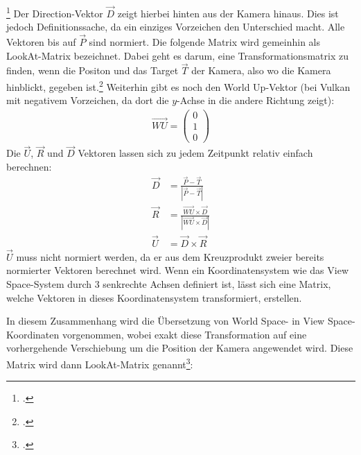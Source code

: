 \documentclass[titlepage, 11pt, a4paper, ngerman]{article}
\begin{document}
\footcitetext{logl-camera}
Der Direction-Vektor $\vec{D}$ zeigt hierbei hinten aus der Kamera hinaus. Dies ist jedoch Definitionssache, da ein einziges Vorzeichen den Unterschied macht. Alle Vektoren bis auf $\vec{P}$ sind normiert. Die folgende Matrix wird gemeinhin als LookAt-Matrix bezeichnet. Dabei geht es darum, eine Transformationsmatrix zu finden, wenn die Positon und das Target $\vec{T}$ der Kamera, also wo die Kamera hinblickt, gegeben ist.\footcite{camera} Weiterhin gibt es noch den World Up-Vektor (bei Vulkan mit negativem Vorzeichen, da dort die $y$-Achse in die andere Richtung zeigt): 
\begin{align*}
    \vec{WU} = \begin{pmatrix}
    0 \\
    1 \\
    0
    \end{pmatrix}
\end{align*}
\bigbreak
Die $\vec{U}$, $\vec{R}$ und $\vec{D}$ Vektoren lassen sich zu jedem Zeitpunkt relativ einfach berechnen:
\begin{align*}
    \vec{D} &= \frac{\vec{P} - \vec{T}}{|\vec{P} - \vec{T}|} \\
    \vec{R} &= \frac{\vec{WU} \times \vec{D}}{|\vec{WU} \times \vec{D}|} \\
    \vec{U} &= \vec{D} \times \vec{R}
\end{align*}
\bigbreak
$\vec{U}$ muss nicht normiert werden, da er aus dem Kreuzprodukt zweier bereits normierter Vektoren berechnet wird. Wenn ein Koordinatensystem wie das View Space-System durch 3 senkrechte Achsen definiert ist, lässt sich eine Matrix, welche Vektoren in dieses Koordinatensystem transformiert, erstellen.\par
In diesem Zusammenhang wird die Übersetzung von World Space- in View Space-Koordinaten vorgenommen, wobei exakt diese Transformation auf eine vorhergehende Verschiebung um die Position der Kamera angewendet wird. Diese Matrix wird dann LookAt-Matrix genannt\footcite{camera}:
\end{document}
